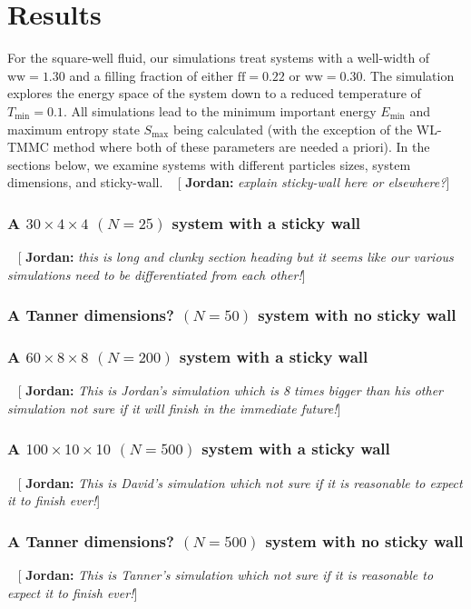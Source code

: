 \documentclass[letterpaper,twocolumn,amsmath,amssymb,pre,aps,10pt]{revtex4-1}
\newcommand{\blue}[1]{{\bf \color{blue} #1}}
\newcommand{\jpsays}[1]{{\color{red} [\blue{Jordan:} \emph{#1}]}}
\begin{document}
\section{Results}

For the square-well fluid, our simulations treat systems with a
well-width of $\text{ww} = 1.30$ and a filling fraction of either
$\text{ff} = 0.22$ or $\text{ww} = 0.30$.  The simulation explores the
energy space of the system down to a reduced temperature of
$T_{\text{min}} = 0.1$.  All simulations lead to the minimum important
energy $E_{\text{min}}$ and maximum entropy state $S_{\text{max}}$
being calculated (with the exception of the WL-TMMC method where both
of these parameters are needed a priori).  In the sections below, we
examine systems with different particles sizes, system dimensions, and
sticky-wall. ~\jpsays{explain sticky-wall here or elsewhere?}

\subsubsection{A $30\times4\times4$ $(N = 25)$ system with a sticky
wall}~\jpsays{this is long and clunky section heading but it seems
like our various simulations need to be differentiated from each
other!}

\subsubsection{A Tanner dimensions? $(N = 50)$ system with no sticky
wall}

\subsubsection{A $60\times8\times8$ $(N = 200)$ system with a sticky
wall}~\jpsays{This is Jordan's simulation which is 8 times bigger than
his other simulation not sure if it will finish in the immediate future!}

\subsubsection{A $100\times10\times10$ $(N = 500)$ system with a sticky
wall}~\jpsays{This is David's simulation which not sure if it is
reasonable to expect it to finish ever!}

\subsubsection{A Tanner dimensions? $(N = 500)$ system with no sticky
wall}~\jpsays{This is Tanner's simulation which not sure if it is
reasonable to expect it to finish ever!}
\end{document}
